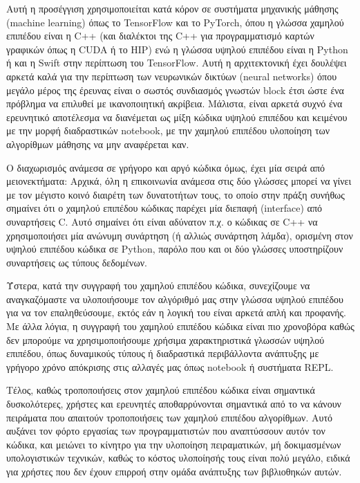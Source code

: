 Αυτή η προσέγγιση χρησιμοποιείται κατά κόρον σε συστήματα μηχανικής μάθησης (machine learning) όπως το TensorFlow και το PyTorch, όπου η γλώσσα χαμηλού επιπέδου είναι η C++ (και διαλέκτοι της C++ για προγραμματισμό καρτών γραφικών όπως η CUDA ή το HIP) ενώ η γλώσσα υψηλού επιπέδου είναι η Python ή και η Swift στην περίπτωση του TensorFlow.
Αυτή η αρχιτεκτονική έχει δουλέψει αρκετά καλά για την περίπτωση των νευρωνικών δικτύων (neural networks) όπου μεγάλο μέρος της έρευνας είναι ο σωστός συνδιασμός γνωστών block έτσι ώστε ένα πρόβλημα να επιλυθεί με ικανοποιητική ακρίβεια.
Μάλιστα, είναι αρκετά συχνό ένα ερευνητικό αποτέλεσμα να διανέμεται ως μίξη κώδικα υψηλού επιπέδου και κειμένου με την μορφή διαδραστικών notebook, με την χαμηλού επιπέδου υλοποίηση των αλγορίθμων μάθησης να μην αναφέρεται καν.

Ο διαχωρισμός ανάμεσα σε γρήγορο και αργό κώδικα όμως, έχει μία σειρά από μειονεκτήματα:
Αρχικά, όλη η επικοινωνία ανάμεσα στις δύο γλώσσες μπορεί να γίνει με τον μέγιστο κοινό διαιρέτη των δυνατοτήτων τους, το οποίο στην πράξη συνήθως σημαίνει ότι ο χαμηλού επιπέδου κώδικας παρέχει μία διεπαφή (interface) από συναρτήσεις C.
Αυτό σημαίνει ότι είναι αδύνατον π.χ. ο κώδικας σε C++ να χρησιμοποιήσει μία ανώνυμη συνάρτηση (ή αλλιώς συνάρτηση λάμδα), ορισμένη στον υψηλού επιπέδου κώδικα σε Python, παρόλο που και οι δύο γλώσσες υποστηρίζουν συναρτήσεις ως τύπους δεδομένων.

Ύστερα, κατά την συγγραφή του χαμηλού επιπέδου κώδικα, συνεχίζουμε να αναγκαζόμαστε να υλοποιήσουμε τον αλγόριθμό μας στην γλώσσα υψηλού επιπέδου για να τον επαληθεύσουμε, εκτός εάν η λογική του είναι αρκετά απλή και προφανής.
Με άλλα λόγια, η συγγραφή του χαμηλού επιπέδου κώδικα είναι πιο χρονοβόρα καθώς δεν μπορούμε να χρησιμοποιήσουμε χρήσιμα χαρακτηριστικά γλωσσών υψηλού επιπέδου, όπως δυναμικούς τύπους ή διαδραστικά περιβάλλοντα ανάπτυξης με γρήγορο χρόνο απόκρισης στις αλλαγές μας όπως notebook ή συστήματα REPL.

Τέλος, καθώς τροποποιήσεις στον χαμηλού επιπέδου κώδικα είναι σημαντικά δυσκολότερες, χρήστες και ερευνητές αποθαρρύνονται σημαντικά από το να κάνουν πειράματα που απαιτούν τροποποιήσεις των χαμηλού επιπέδου αλγορίθμων.
Αυτό αυξάνει τον φόρτο εργασίας των προγραμματιστών που αναπτύσσουν αυτόν τον κώδικα, και μειώνει το κίνητρο για την υλοποίηση πειραματικών, μή δοκιμασμένων υπολογιστικών τεχνικών, καθώς το κόστος υλοποίησής τους είναι πολύ μεγάλο, ειδικά για χρήστες που δεν έχουν επιρροή στην ομάδα ανάπτυξης των βιβλιοθηκών αυτών.

